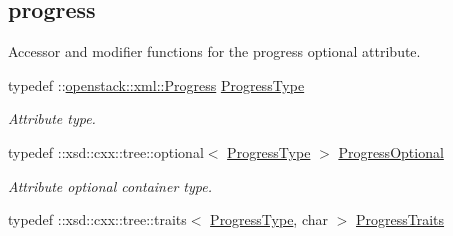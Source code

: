 \subsection*{progress}
\label{_amgrp3c709b10a5d47ba33d85337dd9110917}
Accessor and modifier functions for the progress optional attribute. \begin{DoxyCompactItemize}
\item 
\hypertarget{classopenstack_1_1xml_1_1Server_a3625c122202e5391c227363e6c00bb93}{
typedef ::\hyperlink{classopenstack_1_1xml_1_1Progress}{openstack::xml::Progress} \hyperlink{classopenstack_1_1xml_1_1Server_a3625c122202e5391c227363e6c00bb93}{ProgressType}}
\label{classopenstack_1_1xml_1_1Server_a3625c122202e5391c227363e6c00bb93}

\begin{DoxyCompactList}\small\item\em Attribute type. \item\end{DoxyCompactList}\item 
\hypertarget{classopenstack_1_1xml_1_1Server_a88d757bf2e2217b7404fdb184c719e8e}{
typedef ::xsd::cxx::tree::optional$<$ \hyperlink{classopenstack_1_1xml_1_1Progress}{ProgressType} $>$ \hyperlink{classopenstack_1_1xml_1_1Server_a88d757bf2e2217b7404fdb184c719e8e}{ProgressOptional}}
\label{classopenstack_1_1xml_1_1Server_a88d757bf2e2217b7404fdb184c719e8e}

\begin{DoxyCompactList}\small\item\em Attribute optional container type. \item\end{DoxyCompactList}\item 
\hypertarget{classopenstack_1_1xml_1_1Server_af168e9875d890513a86bc190d39f0078}{
typedef ::xsd::cxx::tree::traits$<$ \hyperlink{classopenstack_1_1xml_1_1Progress}{ProgressType}, char $>$ \hyperlink{classopenstack_1_1xml_1_1Server_af168e9875d890513a86bc190d39f0078}{ProgressTraits}}
\label{classopenstack_1_1xml_1_1Server_af168e9875d890513a86bc190d39f0078}


\end{DoxyCompactItemize}
